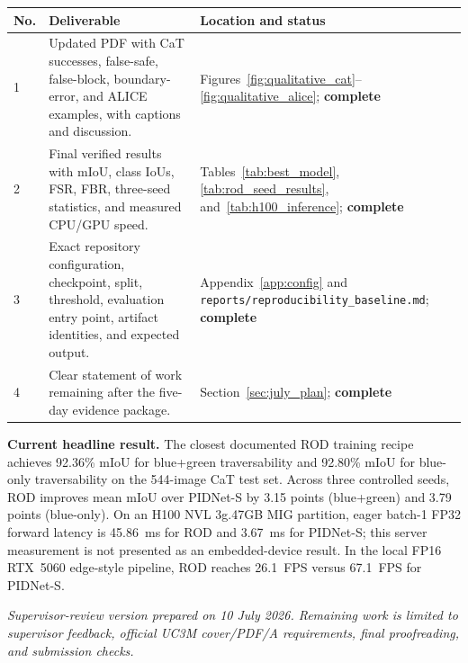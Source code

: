 \documentclass[12pt,a4paper]{report}
\begin{document}
\begingroup
\renewcommand{\arraystretch}{1.25}
\begin{tabularx}{\textwidth}{@{}p{}X p{}@{}}
\toprule
\textbf{No.} & \textbf{Deliverable} & \textbf{Location and status} \\
\midrule
1 & Updated PDF with CaT successes, false-safe, false-block, boundary-error,
and ALICE examples, with captions and discussion. &
Figures~\ref{fig:qualitative_cat}--\ref{fig:qualitative_alice}; \textbf{complete} \\

2 & Final verified results with mIoU, class IoUs, FSR, FBR, three-seed
statistics, and measured CPU/GPU speed. & Tables~\ref{tab:best_model},
\ref{tab:rod_seed_results}, and~\ref{tab:h100_inference}; \textbf{complete} \\

3 & Exact repository configuration, checkpoint, split, threshold, evaluation
entry point, artifact identities, and expected output. &
Appendix~\ref{app:config} and \texttt{reports/reproducibility\_baseline.md};
\textbf{complete} \\

4 & Clear statement of work remaining after the five-day evidence package. &
Section~\ref{sec:july_plan}; \textbf{complete} \\
\bottomrule
\end{tabularx}
\endgroup

\vspace{1em}
\noindent\textbf{Current headline result.}
The closest documented ROD training recipe achieves 92.36\% mIoU for
blue+green traversability and 92.80\% mIoU for blue-only traversability on the
544-image CaT test set. Across three controlled seeds, ROD improves mean mIoU
over PIDNet-S by 3.15 points (blue+green) and 3.79 points (blue-only). On an
H100 NVL 3g.47GB MIG partition, eager batch-1 FP32 forward latency is 45.86~ms
for ROD and 3.67~ms for PIDNet-S; this server measurement is not presented as
an embedded-device result. In the local FP16 RTX~5060 edge-style pipeline, ROD
reaches 26.1~FPS versus 67.1~FPS for PIDNet-S.

\vfill
\noindent\textit{Supervisor-review version prepared on 10 July 2026. Remaining
work is limited to supervisor feedback, official UC3M cover/PDF/A requirements,
final proofreading, and submission checks.}
\clearpage

\end{document}
